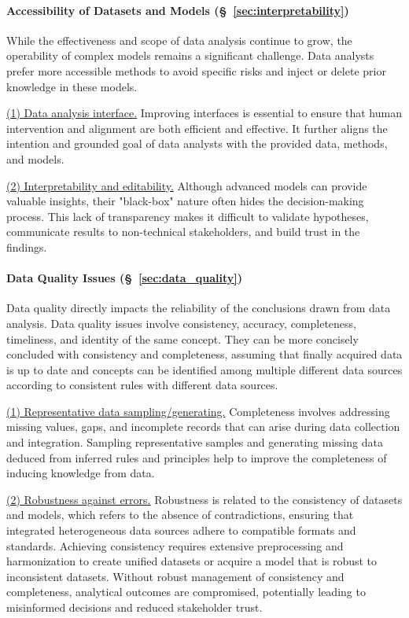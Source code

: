   \paragraph{Accessibility of Datasets and Models (\S~\ref{sec:interpretability})}  
  While the effectiveness and scope of data analysis continue to grow, the operability of complex models remains a significant challenge. Data analysts prefer more accessible methods to avoid specific risks and inject or delete prior knowledge in these models. 
  
  \underline{(1) Data analysis interface.} Improving interfaces is essential to ensure that human intervention and alignment are both efficient and effective. It further aligns the intention and grounded goal of data analysts with the provided data, methods, and models.
  
  
  \underline{(2) Interpretability and editability.} Although advanced models can provide valuable insights, their "black-box" nature often hides the decision-making process. This lack of transparency makes it difficult to validate hypotheses, communicate results to non-technical stakeholders, and build trust in the findings.
  
  
  \paragraph{Data Quality Issues (\S~\ref{sec:data_quality})}  
  Data quality directly impacts the reliability of the conclusions drawn from data analysis. Data quality issues involve consistency, accuracy, completeness, timeliness, and identity of the same concept. They can be more concisely concluded with consistency and completeness, assuming that finally acquired data is up to date and concepts can be identified among multiple different data sources according to consistent rules with different data sources.
  
  \underline{(1) Representative data sampling/generating.} Completeness involves addressing missing values, gaps, and incomplete records that can arise during data collection and integration. Sampling representative samples and generating missing data deduced from inferred rules and principles help to improve the completeness of inducing knowledge from data. 
  
  \underline{(2) Robustness against errors.} Robustness is related to the consistency of datasets and models, which refers to the absence of contradictions, ensuring that integrated heterogeneous data sources adhere to compatible formats and standards. Achieving consistency requires extensive preprocessing and harmonization to create unified datasets or acquire a model that is robust to inconsistent datasets. Without robust management of consistency and completeness, analytical outcomes are compromised, potentially leading to misinformed decisions and reduced stakeholder trust.
  
